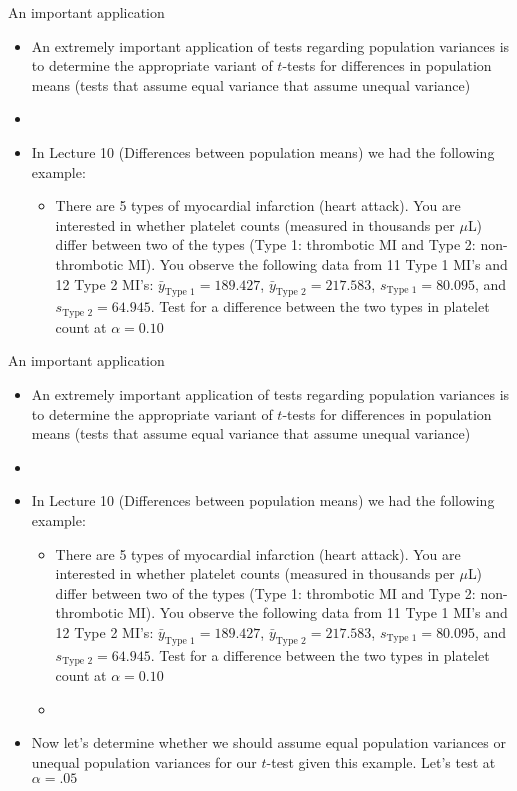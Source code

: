 \documentclass[xcolor=dvipsnames]{beamer}
\begin{document}
\begin{frame}{An important application}
	\begin{itemize}
		\item An extremely important application of tests regarding population variances is to determine the appropriate variant of $t$-tests for differences in population means (tests that assume equal variance that assume unequal variance)
		\item[]
		\item In Lecture 10 (Differences between population means) we had the following example: 
		\begin{itemize}
			\item There are 5 types of myocardial infarction (heart attack). You are interested in whether platelet counts (measured in thousands per $\mu$L) differ between two of the types (Type 1: thrombotic MI and Type 2: non-thrombotic MI). You observe the following data from 11 Type 1 MI's and 12 Type 2 MI's: $\bar{y}_{\text{Type 1}}=189.427$, $\bar{y}_{\text{Type 2}}=217.583$, $s_{\text{Type 1}} = 80.095$, and $s_{\text{Type 2}} = 64.945$. Test for a difference between the two types in platelet count at $\alpha = 0.10$
		\end{itemize}
	\end{itemize}
\end{frame}

\begin{frame}{An important application}
	\begin{itemize}
		\item An extremely important application of tests regarding population variances is to determine the appropriate variant of $t$-tests for differences in population means (tests that assume equal variance that assume unequal variance)
		\item[]
		\item In Lecture 10 (Differences between population means) we had the following example: 
		\begin{itemize}
			\item {\tiny There are 5 types of myocardial infarction (heart attack). You are interested in whether platelet counts (measured in thousands per $\mu$L) differ between two of the types (Type 1: thrombotic MI and Type 2: non-thrombotic MI). You observe the following data from 11 Type 1 MI's and 12 Type 2 MI's: $\bar{y}_{\text{Type 1}}=189.427$, $\bar{y}_{\text{Type 2}}=217.583$, $s_{\text{Type 1}} = 80.095$, and $s_{\text{Type 2}} = 64.945$. Test for a difference between the two types in platelet count at $\alpha = 0.10$}
			\item[]
		\end{itemize}
	\item Now let's determine whether we should assume equal population variances or unequal population variances for our $t$-test given this example. Let's test at $\alpha = .05$
	\end{itemize}
\end{frame}
\end{document}
